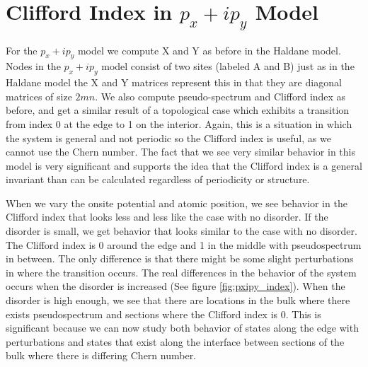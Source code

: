 \documentclass[a4paper]{article}
\begin{document}
\section{Clifford Index in \texorpdfstring{$p_x + ip_y$}{px + ipy} Model} \label{sec:Cliff_px}
For the $p_x + ip_y$ model we compute X and Y as before in the Haldane model.
Nodes in the $p_x + ip_y$ model consist of two sites (labeled A and B) just as in the Haldane model the X and Y matrices represent this in that they are diagonal matrices of size $2mn$.
We also compute pseudo-spectrum and Clifford index as before, and get a similar result of a topological case which exhibits a transition from index 0 at the edge to 1 on the interior.
Again, this is a situation in which the system is general and not periodic so the Clifford index is useful, as we cannot use the Chern number.
The fact that we see very similar behavior in this model is very significant and supports the idea that the Clifford index is a general invariant than can be calculated regardless of periodicity or structure.

When we vary the onsite potential and atomic position, we see behavior in the Clifford index that looks less and less like the case with no disorder.
If the disorder is small, we get behavior that looks similar to the case with no disorder.
The Clifford index is 0 around the edge and 1 in the middle with pseudospectrum in between.
The only difference is that there might be some slight perturbations in where the transition occurs.
The real differences in the behavior of the system occurs when the disorder is increased (See figure \ref{fig:pxipy_index}).
When the disorder is high enough, we see that there are locations in the bulk where there exists pseudospectrum and sections where the Clifford index is 0.
This is significant because we can now study both behavior of states along the edge with perturbations and states that exist along the interface between sections of the bulk where there is differing Chern number.
\end{document}
